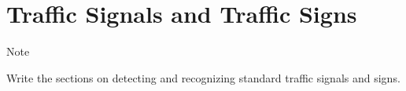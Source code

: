 \hypertarget{traffic-signals-and-traffic-signs}{%
\section{Traffic Signals and Traffic
Signs}\label{traffic-signals-and-traffic-signs}}

Note

Write the sections on detecting and recognizing standard traffic signals
and signs.
